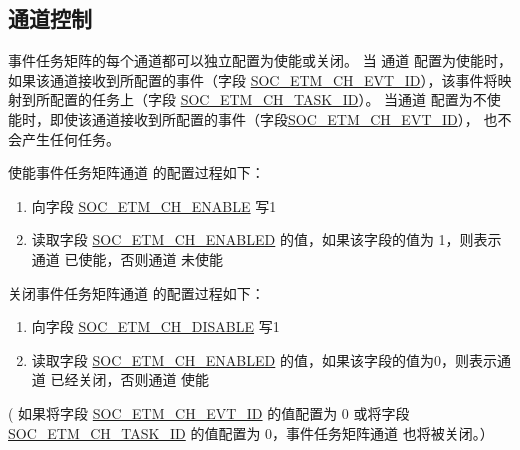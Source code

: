 \documentclass[main\_\_CN.tex]{subfiles}
\begin{document}
\subsection{通道控制}
\label{sec:evntaskmatrix-channel-enable}

事件任务矩阵的每个通道都可以独立配置为使能或关闭。 当 通道 配置为使能时，如果该通道接收到所配置的事件（字段 \hyperref[fielddesc:SOCETMCH0EVTID]{SOC\_ETM\_CH\_EVT\_ID}），该事件将映射到所配置的任务上（字段 \hyperref[fielddesc:SOCETMCH0TASKID]{SOC\_ETM\_CH\_TASK\_ID}）。 当通道 配置为不使能时，即使该通道接收到所配置的事件（字段\hyperref[fielddesc:SOCETMCH0EVTID]{SOC\_ETM\_CH\_EVT\_ID}）， 也不会产生任何任务。

使能事件任务矩阵通道 的配置过程如下：
\begin{enumerate}
    \item 向字段 \hyperref[fielddesc:SOCETMCHENABLE0]{SOC\_ETM\_CH\_ENABLE} 写1
    \item 读取字段 \hyperref[fielddesc:SOCETMCHENABLED0]{SOC\_ETM\_CH\_ENABLED} 的值，如果该字段的值为 1，则表示通道 已使能，否则通道 未使能
\end{enumerate}

关闭事件任务矩阵通道 的配置过程如下：
\begin{enumerate}
    \item 向字段 \hyperref[fielddesc:SOCETMCHDISABLE0]{SOC\_ETM\_CH\_DISABLE} 写1
    \item 读取字段 \hyperref[fielddesc:SOCETMCHENABLED0]{SOC\_ETM\_CH\_ENABLED} 的值，如果该字段的值为0，则表示通道 已经关闭，否则通道 使能
\end{enumerate}

( 如果将字段 \hyperref[fielddesc:SOCETMCH0EVTID]{SOC\_ETM\_CH\_EVT\_ID} 的值配置为 0 或将字段 \hyperref[fielddesc:SOCETMCH0TASKID]{SOC\_ETM\_CH\_TASK\_ID} 的值配置为 0，事件任务矩阵通道 也将被关闭。）
\end{document}
